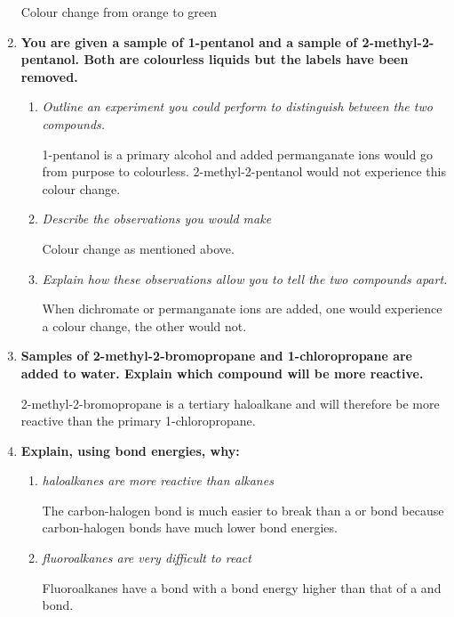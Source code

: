 \documentclass{report}
\begin{document}
\begin{enumerate}
			Colour change from orange to green

		\item \textbf{You are given a sample of 1-pentanol and a sample of 2-methyl-2-pentanol. Both are colourless liquids but the labels have been removed.}

			\begin{enumerate}
				\item \textit{Outline an experiment you could perform to distinguish between the two compounds.}

					1-pentanol is a primary alcohol and added permanganate ions would go from purpose to colourless. 2-methyl-2-pentanol would not experience this colour change.

				\item \textit{Describe the observations you would make}

					Colour change as mentioned above.

				\item \textit{Explain how these observations allow you to tell the two compounds apart.}

					When dichromate or permanganate ions are added, one would experience a colour change, the other would not.
			\end{enumerate}

		\item \textbf{Samples of 2-methyl-2-bromopropane and 1-chloropropane are added to water. Explain which compound will be more reactive.}

			2-methyl-2-bromopropane is a tertiary haloalkane and will therefore be more reactive than the primary 1-chloropropane.

		\item \textbf{Explain, using bond energies, why:}

			\begin{enumerate}
				\item \textit{haloalkanes are more reactive than alkanes}

					The carbon-halogen bond is much easier to break than a  or  bond because carbon-halogen bonds have much lower bond energies.

				\item \textit{fluoroalkanes are very difficult to react}

					Fluoroalkanes have a  bond with a bond energy higher than that of a  and  bond.
			\end{enumerate}

	\end{enumerate}
\end{document}
